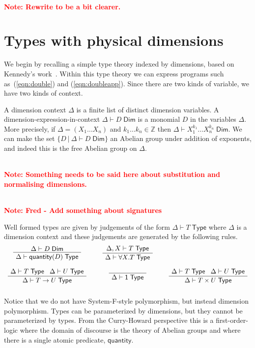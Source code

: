 \documentclass[a4paper,UKenglish]{lipics}
\newcommand\note[1]{{ \bf \textcolor{red} {\vspace{2mm}\; \\ Note: #1\\}}}
\newcommand{\msf}[1]{\mathsf{#1}} %
\newcommand{\Ab}{\msf{Ab}}
\newcommand{\LAb}{\msf{L}_{\msf{Ab}}}
\newcommand{\C}{\mathcal{C}}
\newcommand{\qnt}{\msf{quantity}}
\newcommand{\Tj}[2]{#1 \vdash #2 \; \msf{ Type}}
\newcommand{\Dj}[2]{#1 \vdash #2 \; \msf{ Dim}}
\newcommand{\Dim}{D}
\newcommand{\Dvar}{X}
\begin{document}
\note{Rewrite to be a bit clearer.}



\section{Types with physical dimensions}
\label{sec:Not}
We begin by recalling a simple type theory indexed by dimensions, based
on Kennedy's work~\cite{}.
Within this type theory we can express programs such as~(\ref{eqn:double}) and
(\ref{eqn:doubleapp}).
Since there are two kinds of variable, we have two kinds of context.

A dimension context $\Delta$ is a finite list of distinct
dimension variables.
A dimension-expression-in-context $\Dj\Delta \Dim$ is a monomial
$\Dim$ in the variables $\Delta$.
More precisely,
if $\Delta=(\Dvar_1\dots \Dvar_n)$ and $k_1\dots k_n\in\mathbb Z$
then $\Dj \Delta{\Dvar_1^{k_1}\dots \Dvar_n^{k_n}}$.
We can make the set $\{\Dim~|~\Dj \Delta \Dim\}$ an Abelian group under addition of
exponents, and indeed this is the free Abelian group on $\Delta$.

\note{Something needs to be said here about substitution and normalising dimensions.}


\note{Fred - Add something about signatures}

Well formed types are given by judgements of the form $\Tj\Delta  T$ where
$\Delta$ is a dimension context and these judgements are generated by the following rules.
\[\begin{array}{ccc}
\AxiomC{$\Dj\Delta \Dim$}
		\UnaryInfC{$\Tj\Delta {\qnt(\Dim)}$}
		\DisplayProof

&\hspace{5mm}
\AxiomC{$\Tj {\Delta, \Dvar}  T$}
	\UnaryInfC{$\Tj \Delta{ \forall \Dvar.T} $}
	\DisplayProof
\\ \\
\AxiomC{$\Delta \vdash T \; \msf{ Type} \; \; \; \Delta \vdash U \; \msf{ Type}$}
	\UnaryInfC{$\Delta \vdash T \rightarrow U  \; \msf{ Type}$}
	\DisplayProof
&\hspace{5mm}
\AxiomC{ \;  }
		\UnaryInfC{$\Delta \vdash \msf{1} \; \msf{ Type}$}
	\DisplayProof
&\hspace{5mm}
\AxiomC{$\Delta \vdash T \; \msf{ Type} \; \; \; \Delta \vdash U \; \msf{ Type}$}
	\UnaryInfC{$\Delta \vdash T\times U \; \msf{ Type}$}
	\DisplayProof
\\ \\
\end{array}\]
Notice that we do not have System-F-style polymorphism, but instead dimension polymorphism. Types can be parameterized by dimensions, but they cannot be parameterized by types. From the Curry-Howard perspective this is a first-order-logic where the domain of discourse is the theory of Abelian groups and where there is a single atomic predicate, $\qnt$.
\end{document}
